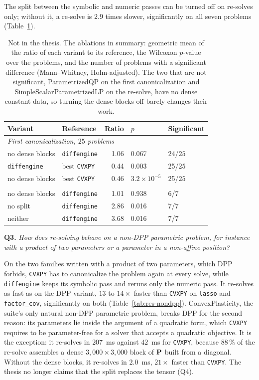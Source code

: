 \documentclass[letterpaper,12pt]{article}
\newcommand{\ac}[1]{#1}
\newcommand{\question}[2]{\FloatBarrier\par\bigskip\textbf{Q#1.} \emph{#2}\par}
\begin{document}
The split between the symbolic and numeric passes can be turned off on re-solves only; without
it, a re-solve is $2.9$ times slower, significantly on all seven problems
(Table~\ref{tab:res-ablation}).

\begin{table}[htbp]
\centering
\caption{Not in the thesis. The ablations in summary: geometric mean of the ratio of each variant to its
reference, the Wilcoxon $p$-value over the problems,
and the number of problems with a significant difference (Mann--Whitney, Holm-adjusted). The
two that are not significant, ParametrizedQP on the first canonicalization and
SimpleScalarParametrizedLP on the re-solve, have no dense constant data, so turning the dense
blocks off barely changes their work.}
\label{tab:res-ablation}
{\small
\begin{tabular}{l l r l l}
\toprule
Variant & Reference & Ratio & $p$ & Significant \\
\midrule
\multicolumn{5}{l}{\textit{First canonicalization, $25$ problems}} \\
no dense blocks        & \texttt{diffengine}  & 1.06 & 0.067 & 24/$25$ \\
\texttt{diffengine}    & best \texttt{CVXPY}  & 0.44 & 0.003 & 25/$25$ \\
no dense blocks        & best \texttt{CVXPY}  & 0.46 & $3.2 \times 10^{-5}$ & 25/$25$ \\
\addlinespace
\multicolumn{5}{l}{\textit{Re-solve, $7$ \ac{DPP} problems}} \\
no dense blocks        & \texttt{diffengine}  & 1.01 & 0.938 & 6/$7$ \\
no split               & \texttt{diffengine}  & 2.86 & 0.016 & 7/$7$ \\
neither                & \texttt{diffengine}  & 3.68 & 0.016 & 7/$7$ \\
\bottomrule
\end{tabular}}
\end{table}


\question{3}{How does re-solving behave on a non-DPP parametric problem, for instance with a
product of two parameters or a parameter in a non-affine position?}
On the two families written with a product of two parameters, which \ac{DPP} forbids,
\texttt{CVXPY} has to canonicalize the problem again at every solve, while \texttt{diffengine}
keeps its symbolic pass and reruns only the numeric pass. It re-solves as fast as on the
\ac{DPP} variant, $13$ to $14\times$ faster than \texttt{CVXPY} on \texttt{lasso} and
\texttt{factor\_cov}, significantly on both (Table~\ref{tab:res-nondpp}). ConvexPlasticity, the suite's only natural non-DPP parametric problem, breaks \ac{DPP} for the
second reason: its parameters lie inside the argument of a quadratic form, which \texttt{CVXPY}
requires to be parameter-free for a solver that accepts a quadratic objective. It is the
exception: it re-solves in $207$~ms
against $42$~ms for \texttt{CVXPY}, because $88\,\%$ of the re-solve assembles a dense $3{,}000
\times 3{,}000$ block of $\mathbf{P}$ built from a diagonal. Without the dense blocks, it re-solves
in $2.0$~ms, $21\times$ faster than \texttt{CVXPY}. The thesis no longer claims that the split
replaces the tensor (Q4).
\end{document}
